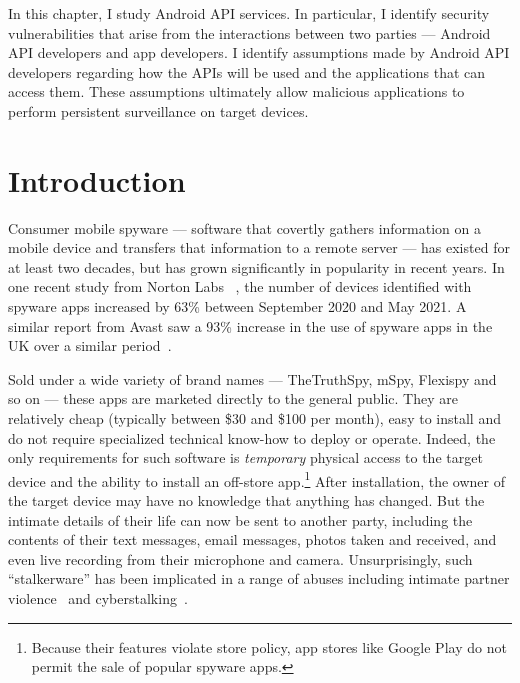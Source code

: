 In this chapter, I study Android API services. In particular, I identify security vulnerabilities that arise from the interactions between two parties --- Android API developers and app developers. I identify assumptions made by Android API developers regarding how the APIs will be used and the applications that can access them. These assumptions ultimately allow malicious applications to perform persistent surveillance on target devices.

\section{Introduction}

Consumer mobile spyware --- software that covertly gathers information
on a mobile device and transfers that information to a remote server
--- has existed for at least two decades, but has grown significantly
in popularity in recent years.  In one recent study from Norton Labs
~\cite{AYearAft87:online}, the number of devices identified with
spyware apps increased by 63\% between September 2020 and May 2021. A
similar report from Avast saw a 93\% increase in the use of spyware
apps in the UK over a similar period~\cite{UseofSta91:online}.

Sold under a wide variety of brand names --- TheTruthSpy, mSpy,
Flexispy and so on --- these apps are marketed directly to the general
public.  They are relatively cheap (typically between \$30 and \$100
per month), easy to install and do not require specialized technical
know-how to deploy or operate.  Indeed, the only requirements for such
software is \emph{temporary} physical access to the target device
and the ability to install an off-store app.\footnote{Because their features
  violate store policy, app stores like Google Play do not permit the sale of popular spyware apps.}  After
installation, the owner of the target device may have no knowledge
that anything has changed.  But the intimate details of their life can
now be sent to another party, including the contents of their text
messages, email messages, photos taken and received, and even live
recording from their microphone and camera.  Unsurprisingly, such
``stalkerware'' has been implicated in a range of abuses including
intimate partner violence~\cite{chatterjee2018spyware} and
cyberstalking~\cite{woodlock2017abuse}.

